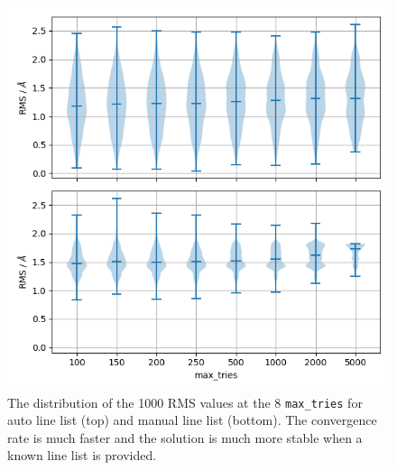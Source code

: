 \documentclass{aa}
\begin{document}
\begin{figure}[h]
    \centering
    \includegraphics[width=\columnwidth]{plots/figure_2_rms.png}
    \caption{The distribution of the 1000 RMS values at the 8 \texttt{max\_tries} for
    auto line list (top) and manual line list (bottom). The convergence rate is much
    faster and the solution is much more stable when a known line list is provided.}
    \label{fig:rms}
\end{figure}
\end{document}
